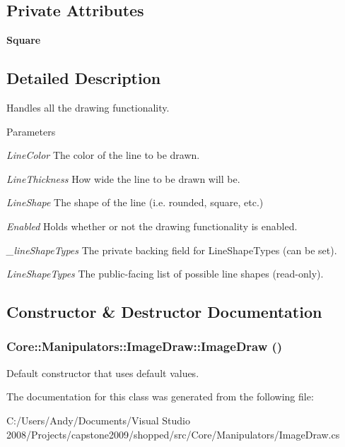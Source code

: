 \subsection*{Private Attributes}
\begin{DoxyCompactItemize}
\item 
\hypertarget{class_core_1_1_manipulators_1_1_image_draw_a9e30e83453c33ee0ac78e088eba006c9}{
{\bfseries Square}}
\label{class_core_1_1_manipulators_1_1_image_draw_a9e30e83453c33ee0ac78e088eba006c9}

\end{DoxyCompactItemize}


\subsection{Detailed Description}
Handles all the drawing functionality.


\begin{DoxyParams}{Parameters}
\item[{\em LineColor}]The color of the line to be drawn. \item[{\em LineThickness}]How wide the line to be drawn will be. \item[{\em LineShape}]The shape of the line (i.e. rounded, square, etc.) \item[{\em Enabled}]Holds whether or not the drawing functionality is enabled. \item[{\em \_\-lineShapeTypes}]The private backing field for LineShapeTypes (can be set). \item[{\em LineShapeTypes}]The public-\/facing list of possible line shapes (read-\/only). \end{DoxyParams}


\subsection{Constructor \& Destructor Documentation}
\hypertarget{class_core_1_1_manipulators_1_1_image_draw_aab2c1c927b836badfc16cc026a1d0fa5}{
\subsubsection[{ImageDraw}]{\setlength{\rightskip}{0pt plus 5cm}Core::Manipulators::ImageDraw::ImageDraw ()}}
\label{class_core_1_1_manipulators_1_1_image_draw_aab2c1c927b836badfc16cc026a1d0fa5}
Default constructor that uses default values. 

The documentation for this class was generated from the following file:\begin{DoxyCompactItemize}
\item 
C:/Users/Andy/Documents/Visual Studio 2008/Projects/capstone2009/shopped/src/Core/Manipulators/ImageDraw.cs\end{DoxyCompactItemize}
